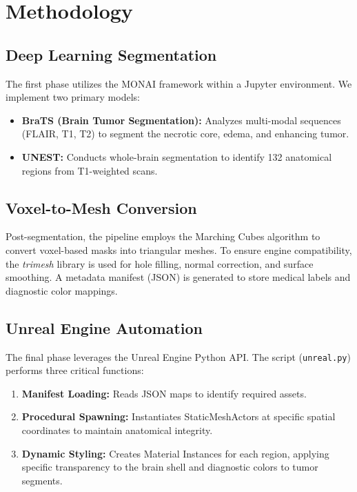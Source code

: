 \documentclass[runningheads]{llncs}
\begin{document}
\section{Methodology}

\subsection{Deep Learning Segmentation}
The first phase utilizes the MONAI framework within a Jupyter environment. We implement two primary models:
\begin{itemize}
    \item \textbf{BraTS (Brain Tumor Segmentation):} Analyzes multi-modal sequences (FLAIR, T1, T2) to segment the necrotic core, edema, and enhancing tumor.
    \item \textbf{UNEST:} Conducts whole-brain segmentation to identify 132 anatomical regions from T1-weighted scans.
\end{itemize}

\subsection{Voxel-to-Mesh Conversion}
Post-segmentation, the pipeline employs the Marching Cubes algorithm to convert voxel-based masks into triangular meshes. To ensure engine compatibility, the \textit{trimesh} library is used for hole filling, normal correction, and surface smoothing. A metadata manifest (JSON) is generated to store medical labels and diagnostic color mappings.

\subsection{Unreal Engine Automation}
The final phase leverages the Unreal Engine Python API. The script (\texttt{unreal.py}) performs three critical functions:
\begin{enumerate}
    \item \textbf{Manifest Loading:} Reads JSON maps to identify required assets.
    \item \textbf{Procedural Spawning:} Instantiates StaticMeshActors at specific spatial coordinates to maintain anatomical integrity.
    \item \textbf{Dynamic Styling:} Creates Material Instances for each region, applying specific transparency to the brain shell and diagnostic colors to tumor segments.
\end{enumerate}
\end{document}
